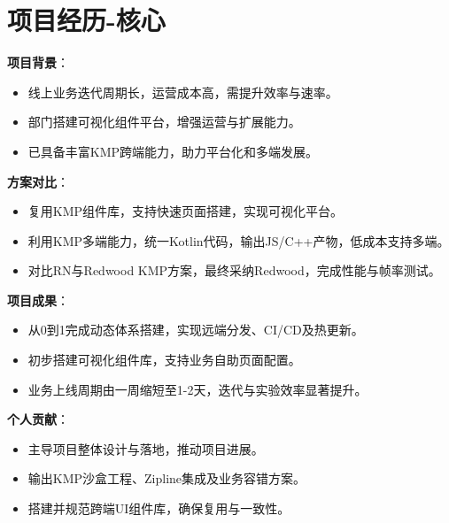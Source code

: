 \documentclass[]{deedy-resume-openfont}
\begin{document}
\begin{minipage}[t]{0.75\textwidth}
\section{项目经历-核心}
\vspace{0.1em}
\begin{tightemize}
    \item \textbf{项目背景}：
        \begin{itemize}
            \item 线上业务迭代周期长，运营成本高，需提升效率与速率。
            \item 部门搭建可视化组件平台，增强运营与扩展能力。
            \item 已具备丰富KMP跨端能力，助力平台化和多端发展。
        \end{itemize} 
    \item \textbf{方案对比}：
        \begin{itemize}
            \item 复用KMP组件库，支持快速页面搭建，实现可视化平台。
            \item 利用KMP多端能力，统一Kotlin代码，输出JS/C++产物，低成本支持多端。
            \item 对比RN与Redwood KMP方案，最终采纳Redwood，完成性能与帧率测试。
        \end{itemize}
    \item \textbf{项目成果}：
        \begin{itemize}
            \item 从0到1完成动态体系搭建，实现远端分发、CI/CD及热更新。
            \item 初步搭建可视化组件库，支持业务自助页面配置。
            \item 业务上线周期由一周缩短至1-2天，迭代与实验效率显著提升。
        \end{itemize}    
    \item \textbf{个人贡献}：
        \begin{itemize}
            \item 主导项目整体设计与落地，推动项目进展。
            \item 输出KMP沙盒工程、Zipline集成及业务容错方案。
            \item 搭建并规范跨端UI组件库，确保复用与一致性。
        \end{itemize}    
\end{tightemize}


\end{minipage}
\end{document}

